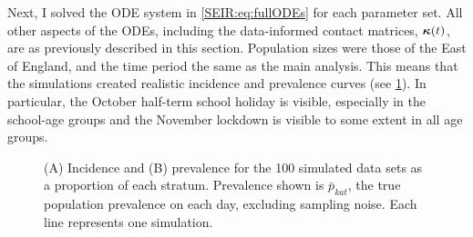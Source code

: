 \documentclass[thesis.tex]{subfiles}
\begin{document}
Next, I solved the ODE system in \cref{SEIR:eq:fullODEs} for each parameter set.
All other aspects of the ODEs, including the data-informed contact matrices, $\bm{\kappa}(t)$, are as previously described in this section.
Population sizes were those of the East of England, and the time period the same as the main analysis.
This means that the simulations created realistic incidence and prevalence curves (see \cref{SEIR:fig:sim-data}).
In particular, the October half-term school holiday is visible, especially in the school-age groups and the November lockdown is visible to some extent in all age groups.
\begin{figure}
    \caption[Simulated data]{%
        (A) Incidence and (B) prevalence for the 100 simulated data sets as a proportion of each stratum.
        Prevalence shown is $\bar{p}_{kat}$, the true population prevalence on each day, excluding sampling noise.
        Each line represents one simulation.
    }
    \label{SEIR:fig:sim-data}
\end{figure}
\end{document}
